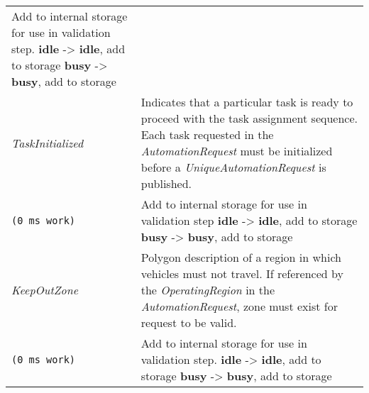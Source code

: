 \begin{longtable}[c]{@{}ll@{}}
\begin{minipage}[t]{0.65\columnwidth}
Add to internal storage for use in validation step. \textbf{idle}
-\textgreater{} \textbf{idle}, add to storage \textbf{busy}
-\textgreater{} \textbf{busy}, add to storage
\strut\end{minipage}\tabularnewline
\begin{minipage}[t]{0.29\columnwidth}\raggedright\strut
\emph{TaskInitialized}
\strut\end{minipage} &
\begin{minipage}[t]{0.65\columnwidth}\raggedright\strut
Indicates that a particular task is ready to proceed with the task
assignment sequence. Each task requested in the \emph{AutomationRequest}
must be initialized before a \emph{UniqueAutomationRequest} is
published.
\strut\end{minipage}\tabularnewline
\begin{minipage}[t]{0.29\columnwidth}\raggedright\strut
\begin{verbatim}
(0 ms work)
\end{verbatim}
\strut\end{minipage} &
\begin{minipage}[t]{0.65\columnwidth}\raggedright\strut
Add to internal storage for use in validation step \textbf{idle}
-\textgreater{} \textbf{idle}, add to storage \textbf{busy}
-\textgreater{} \textbf{busy}, add to storage
\strut\end{minipage}\tabularnewline
\begin{minipage}[t]{0.29\columnwidth}\raggedright\strut
\emph{KeepOutZone}
\strut\end{minipage} &
\begin{minipage}[t]{0.65\columnwidth}\raggedright\strut
Polygon description of a region in which vehicles must not travel. If
referenced by the \emph{OperatingRegion} in the
\emph{AutomationRequest}, zone must exist for request to be valid.
\strut\end{minipage}\tabularnewline
\begin{minipage}[t]{0.29\columnwidth}\raggedright\strut
\begin{verbatim}
(0 ms work)
\end{verbatim}
\strut\end{minipage} &
\begin{minipage}[t]{0.65\columnwidth}\raggedright\strut
Add to internal storage for use in validation step. \textbf{idle}
-\textgreater{} \textbf{idle}, add to storage \textbf{busy}
-\textgreater{} \textbf{busy}, add to storage
\strut\end{minipage}\tabularnewline

\end{longtable}
